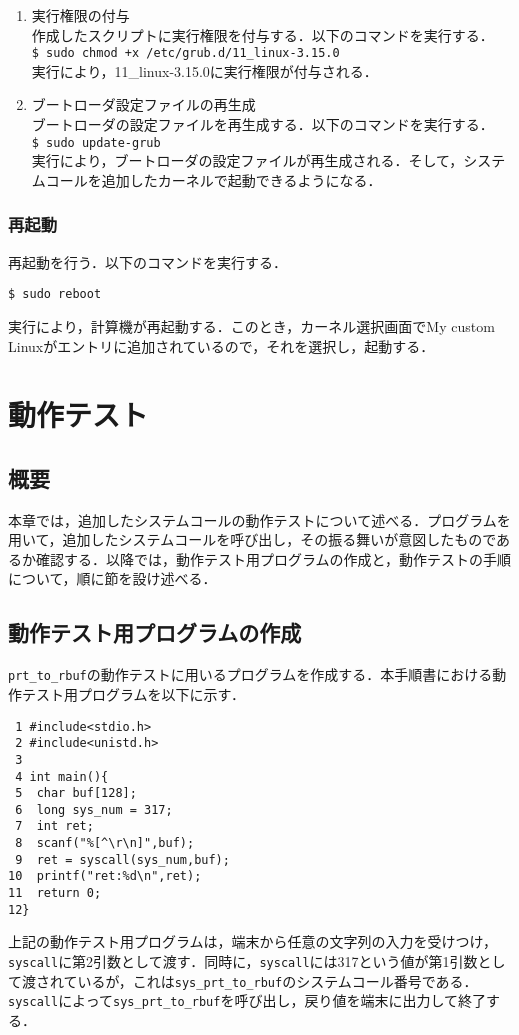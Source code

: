\documentclass[12pt]{jsarticle}
\begin{document}
\begin{enumerate}
\item 実行権限の付与\\
  作成したスクリプトに実行権限を付与する．以下のコマンドを実行する．\\
  \verb|$ sudo chmod +x /etc/grub.d/11_linux-3.15.0|\\
  実行により，11\_linux-3.15.0に実行権限が付与される．\\
\item ブートローダ設定ファイルの再生成\\
  ブートローダの設定ファイルを再生成する．以下のコマンドを実行する．\\
  \verb|$ sudo update-grub|\\
  実行により，ブートローダの設定ファイルが再生成される．そして，システムコールを追加したカーネルで起動できるようになる．\\
\end{enumerate}
\subsubsection{再起動}
再起動を行う．以下のコマンドを実行する．
\begin{verbatim}
$ sudo reboot
\end{verbatim}
  実行により，計算機が再起動する．このとき，カーネル選択画面でMy custom Linuxがエントリに追加されているので，それを選択し，起動する．
\section{動作テスト}
\subsection{概要}
本章では，追加したシステムコールの動作テストについて述べる．プログラムを用いて，追加したシステムコールを呼び出し，その振る舞いが意図したものであるか確認する．以降では，動作テスト用プログラムの作成と，動作テストの手順について，順に節を設け述べる．
\subsection{動作テスト用プログラムの作成}
\verb|prt_to_rbuf|の動作テストに用いるプログラムを作成する．本手順書における動作テスト用プログラムを以下に示す．
\begin{verbatim}
 1 #include<stdio.h>
 2 #include<unistd.h>
 3
 4 int main(){
 5  char buf[128];
 6  long sys_num = 317;
 7  int ret;
 8  scanf("%[^\r\n]",buf);
 9  ret = syscall(sys_num,buf);
10  printf("ret:%d\n",ret);
11  return 0;
12}
\end{verbatim}
上記の動作テスト用プログラムは，端末から任意の文字列の入力を受けつけ，\verb|syscall|に第2引数として渡す．同時に，\verb|syscall|には317という値が第1引数として渡されているが，これは\verb|sys_prt_to_rbuf|のシステムコール番号である．\verb|syscall|によって\verb|sys_prt_to_rbuf|を呼び出し，戻り値を端末に出力して終了する．
\end{document}
